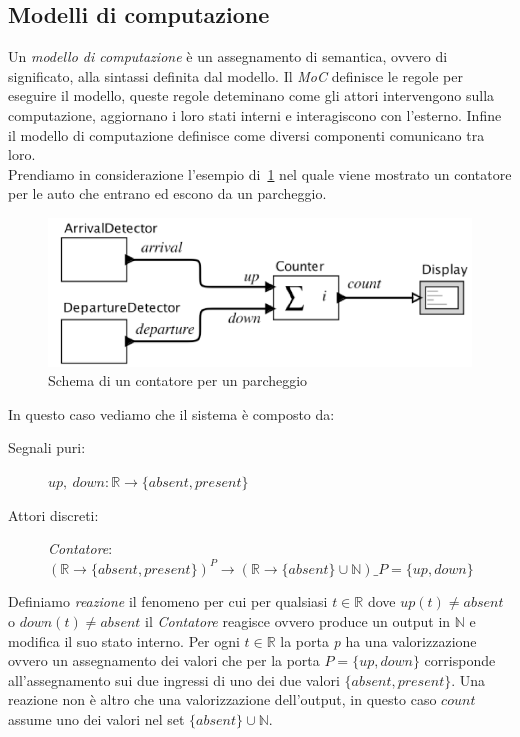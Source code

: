 \subsection{Modelli di computazione}
Un \emph{modello di computazione} è un assegnamento di semantica, ovvero di significato, alla sintassi definita dal modello. Il \emph{MoC} definisce le regole per eseguire il modello, queste regole deteminano come gli attori intervengono sulla computazione, aggiornano i loro stati interni e interagiscono con l'esterno. Infine il modello di computazione definisce come diversi componenti comunicano tra loro.\\
Prendiamo in considerazione l'esempio di \figurename\,\ref{fig:parkschema} nel quale viene mostrato un contatore per le auto che entrano ed escono da un parcheggio.
\begin{figure}
\centering
\includegraphics[scale=0.4]{img/parkschema.png}
\caption{Schema di un contatore per un parcheggio}\label{fig:parkschema}
\end{figure}
In questo caso vediamo che il sistema è composto da:
\begin{description}
\item[Segnali puri:] $up, \ down : \mathbb{R}\rightarrow\{absent,present\}$
\item[Attori discreti:]\emph{Contatore}:$(\mathbb{R}\rightarrow\{absent,present\})^P \rightarrow(\mathbb{R}\rightarrow\{absent\}\cup \mathbb{N})\_P=\{up,down\}$
\end{description}
Definiamo \emph{reazione} il fenomeno per cui per qualsiasi $t\in\mathbb{R}$ dove $up(t)\neq absent$ o  $down(t)\neq absent$ il \emph{Contatore} reagisce ovvero produce un output in $\mathbb{N}$ e modifica il suo stato interno.
Per ogni $t\in\mathbb{R}$ la porta \emph{p} ha una valorizzazione ovvero un assegnamento dei valori che per la porta $P=\{up,down\}$ corrisponde all'assegnamento sui due ingressi di uno dei due valori $\{absent, present\}$. Una reazione non è altro che una valorizzazione dell'output, in questo caso $count$ assume uno dei valori nel set $\{absent\}\cup \mathbb{N}$.\\
